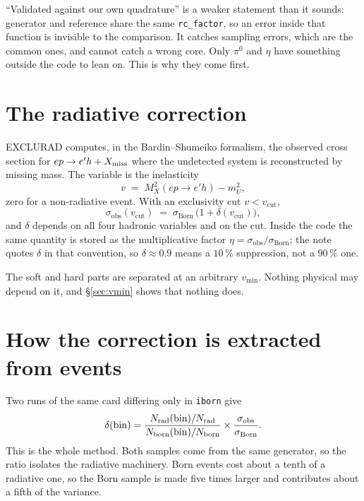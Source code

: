 \documentclass[11pt]{article}
\newcommand{\vcut}{v_{\mathrm{cut}}}
\newcommand{\vmin}{v_{\mathrm{min}}}
\newcommand{\sobs}{\sigma_{\mathrm{obs}}}
\newcommand{\sborn}{\sigma_{\mathrm{Born}}}
\newcommand{\code}[1]{\texttt{#1}}
\begin{document}
``Validated against our own quadrature'' is a weaker statement than it sounds:
generator and reference share the same \code{rc\_factor}, so an error inside
that function is invisible to the comparison. It catches sampling errors,
which are the common ones, and cannot catch a wrong core. Only $\pi^0$ and
$\eta$ have something outside the code to lean on. This is why they come
first.

\section{The radiative correction}

EXCLURAD computes, in the Bardin--Shumeiko formalism, the observed cross
section for $ep\to e'h+X_{\rm miss}$ where the undetected system is
reconstructed by missing mass. The variable is the inelasticity
\begin{equation}
v \;=\; M_X^2(ep\to e'h) - m_U^2 ,
\end{equation}
zero for a non-radiative event. With an exclusivity cut $v<\vcut$,
\begin{equation}
\sobs(\vcut) \;=\; \sborn\,\bigl(1+\delta(\vcut)\bigr),
\end{equation}
and $\delta$ depends on all four hadronic variables and on the cut. Inside the
code the same quantity is stored as the multiplicative factor
$\eta=\sobs/\sborn$; the note quotes $\delta$ in that convention, so
$\delta\approx0.9$ means a $10\,\%$ suppression, not a $90\,\%$ one.

The soft and hard parts are separated at an arbitrary $\vmin$. Nothing
physical may depend on it, and §\ref{sec:vmin} shows that nothing does.

\section{How the correction is extracted from events}

Two runs of the same card differing only in \code{iborn} give
\begin{equation}
\delta(\mathrm{bin})=
\frac{N_{\rm rad}(\mathrm{bin})/N_{\rm rad}}
     {N_{\rm born}(\mathrm{bin})/N_{\rm born}}\times\frac{\sobs}{\sborn}.
\end{equation}
This is the whole method. Both samples come from the same generator, so the
ratio isolates the radiative machinery. Born events cost about a tenth of a
radiative one, so the Born sample is made five times larger and contributes
about a fifth of the variance.
\end{document}
